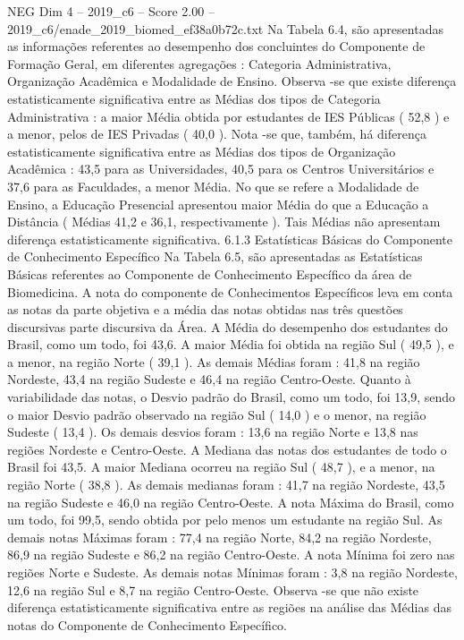 \begin{textsample}{NEG Dim 4 – 2019\_c6 – Score 2.00 – 2019\_c6/enade\_2019\_biomed\_ef38a0b72c.txt}
Na Tabela 6.4, são apresentadas as informações referentes ao desempenho dos concluintes do Componente de Formação Geral, em diferentes agregações : Categoria Administrativa, Organização Acadêmica e Modalidade de Ensino.
Observa -se que existe diferença estatisticamente significativa entre as Médias dos tipos de Categoria Administrativa : a maior Média obtida por estudantes de IES Públicas ( 52,8 ) e a menor, pelos de IES Privadas ( 40,0 ).
Nota -se que, também, há diferença estatisticamente significativa entre as Médias dos tipos de Organização Acadêmica : 43,5 para as Universidades, 40,5 para os Centros Universitários e 37,6 para as Faculdades, a menor Média.
No que se refere a Modalidade de Ensino, a Educação Presencial apresentou maior Média do que a Educação a Distância ( Médias 41,2 e 36,1, respectivamente ).
Tais Médias não apresentam diferença estatisticamente significativa. 6.1.3 Estatísticas Básicas do Componente de Conhecimento Específico Na Tabela 6.5, são apresentadas as Estatísticas Básicas referentes ao Componente de Conhecimento Específico da área de Biomedicina.
A nota do componente de Conhecimentos Específicos leva em conta as notas da parte objetiva e a média das notas obtidas nas três questões discursivas parte discursiva da Área.
A Média do desempenho dos estudantes do Brasil, como um todo, foi 43,6.
A maior Média foi obtida na região Sul ( 49,5 ), e a menor, na região Norte ( 39,1 ).
As demais Médias foram : 41,8 na região Nordeste, 43,4 na região Sudeste e 46,4 na região Centro-Oeste.
Quanto à variabilidade das notas, o Desvio padrão do Brasil, como um todo, foi 13,9, sendo o maior Desvio padrão observado na região Sul ( 14,0 ) e o menor, na região Sudeste ( 13,4 ).
Os demais desvios foram : 13,6 na região Norte e 13,8 nas regiões Nordeste e Centro-Oeste.
A Mediana das notas dos estudantes de todo o Brasil foi 43,5.
A maior Mediana ocorreu na região Sul ( 48,7 ), e a menor, na região Norte ( 38,8 ).
As demais medianas foram : 41,7 na região Nordeste, 43,5 na região Sudeste e 46,0 na região Centro-Oeste.
A nota Máxima do Brasil, como um todo, foi 99,5, sendo obtida por pelo menos um estudante na região Sul.
As demais notas Máximas foram : 77,4 na região Norte, 84,2 na região Nordeste, 86,9 na região Sudeste e 86,2 na região Centro-Oeste.
A nota Mínima foi zero nas regiões Norte e Sudeste.
As demais notas Mínimas foram : 3,8 na região Nordeste, 12,6 na região Sul e 8,7 na região Centro-Oeste.
Observa -se que não existe diferença estatisticamente significativa entre as regiões na análise das Médias das notas do Componente de Conhecimento Específico.

\end{textsample}

